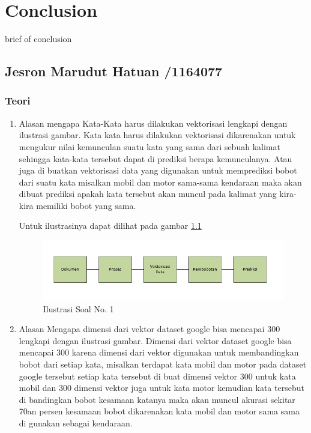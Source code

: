 \chapter{Conclusion}
brief of conclusion

\section{Jesron Marudut Hatuan /1164077}
\subsection{Teori}
\begin{enumerate}
\item Alasan mengapa Kata-Kata harus dilakukan vektorisasi lengkapi dengan ilustrasi gambar.
\subitem Kata kata harus dilakukan vektorisasi dikarenakan untuk mengukur nilai kemunculan suatu kata yang sama dari sebuah kalimat sehingga kata-kata tersebut dapat di prediksi berapa kemunculanya. Atau juga di buatkan vektorisasi data yang digunakan untuk memprediksi bobot dari suatu kata misalkan mobil dan motor sama-sama kendaraan maka akan dibuat prediksi apakah kata tersebut akan muncul pada kalimat yang kira-kira memiliki bobot yang sama. 
\par Untuk ilustrasinya dapat dilihat pada gambar \ref{c5_1}
\begin{figure}[ht]
\centerline{\includegraphics[width=1\textwidth]{figures/c5t/1.png}}
\caption{Ilustrasi Soal No. 1}
\label{c5_1}
\end{figure}
\item Alasan Mengapa dimensi dari vektor dataset google bisa mencapai 300 lengkapi dengan ilustrasi gambar.
\subitem Dimensi dari vektor dataset google bisa mencapai 300 karena dimensi dari vektor digunakan untuk membandingkan bobot dari setiap kata, misalkan terdapat kata mobil dan motor pada dataset google tersebut setiap kata tersebut di buat dimensi vektor 300 untuk kata mobil dan 300 dimensi vektor juga untuk kata motor kemudian kata tersebut di bandingkan bobot kesamaan katanya maka akan muncul akurasi sekitar 70an persen kesamaan bobot dikarenakan kata mobil dan motor sama sama di gunakan sebagai kendaraan.

\end{enumerate}
